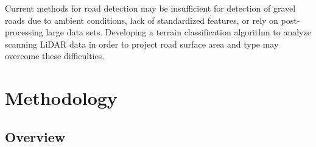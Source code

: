 \documentclass[journal,onecolumn]{IEEEtran}
\begin{document}
	{Current methods for road detection may be insufficient for detection of gravel roads due to ambient conditions, lack of standardized features, or rely on post-processing large data sets. Developing a terrain classification algorithm to analyze scanning LiDAR data in order to project road surface area and type may overcome these difficulties.}
	
	
	
	
	
	
	\section{Methodology}
	
		\subsection{Overview}
		
\end{document}
